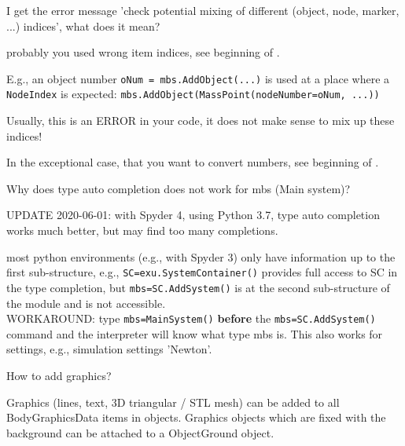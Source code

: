 	\item I get the error message 'check potential mixing of different (object, node, marker, ...) indices', what does it mean?
	\bi
	\item[$\ra$] probably you used wrong item indices, see beginning of . 
	\item E.g., an object number \texttt{oNum = mbs.AddObject(...)} is used at a place where a \texttt{NodeIndex} is expected:
	\texttt{mbs.AddObject(MassPoint(nodeNumber=oNum, ...))}
	\item Usually, this is an ERROR in your code, it does not make sense to mix up these indices!
	\item In the exceptional case, that you want to convert numbers, see beginning of .
	\ei
	\item Why does type auto completion does not work for mbs (Main system)?
	\bi
	\item[$\ra$] UPDATE 2020-06-01: with Spyder 4, using Python 3.7, type auto completion works much better, but may find too many completions.
	\item[$\ra$] most python environments (e.g., with Spyder 3) only have information up to the first sub-structure, e.g., \texttt{SC=exu.SystemContainer()} provides full access to SC in the type completion, but \texttt{mbs=SC.AddSystem()} is at the second sub-structure of the module and is not accessible.\\
	WORKAROUND: type \texttt{mbs=MainSystem()} {\bf before} the \texttt{mbs=SC.AddSystem()} command and the interpreter will know what type mbs is. This also works for settings, e.g., simulation settings 'Newton'.
	\ei
  \item How to add graphics?
	\bi
	\item[$\ra$] Graphics (lines, text, 3D triangular / STL mesh) can be added to all BodyGraphicsData items in objects. Graphics objects which are fixed with the background can be attached to a ObjectGround object.

